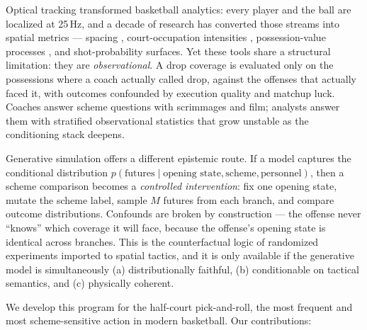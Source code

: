 \documentclass[11pt]{article}
\begin{document}
Optical tracking transformed basketball analytics: every player and the ball
are localized at 25\,Hz, and a decade of research has converted those streams
into spatial metrics --- spacing \citep{skinner2015pitch}, court-occupation
intensities \citep{miller2014factorized}, possession-value processes
\citep{cervone2016multivariate,yamamoto2022epv}, and shot-probability
surfaces. Yet these tools share a structural limitation: they are
\emph{observational}. A drop coverage is evaluated only on the possessions
where a coach actually called drop, against the offenses that actually faced
it, with outcomes confounded by execution quality and matchup luck. Coaches
answer scheme questions with scrimmages and film; analysts answer them with
stratified observational statistics that grow unstable as the conditioning
stack deepens.

Generative simulation offers a different epistemic route. If a model captures
the conditional distribution $p(\text{futures} \mid \text{opening state},
\text{scheme}, \text{personnel})$, then a scheme comparison becomes a
\emph{controlled intervention}: fix one opening state, mutate the scheme
label, sample $M$ futures from each branch, and compare outcome
distributions. Confounds are broken by construction --- the offense never
``knows'' which coverage it will face, because the offense's opening state is
identical across branches. This is the counterfactual logic of randomized
experiments imported to spatial tactics, and it is only available if the
generative model is simultaneously (a) distributionally faithful, (b)
conditionable on tactical semantics, and (c) physically coherent.

We develop this program for the half-court pick-and-roll, the most frequent
and most scheme-sensitive action in modern basketball. Our contributions:
\end{document}
